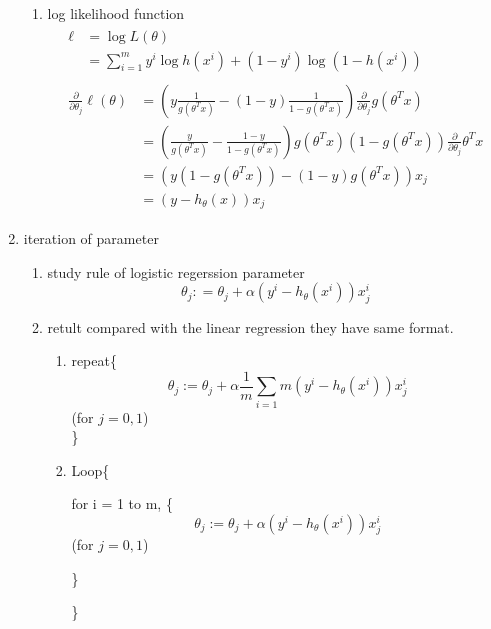 \documentclass[12pt]{ctexart}%
\begin{document}
\begin{enumerate}
\begin{enumerate}
					\item log likelihood function
					\begin{align}
						\begin{split}
							\ell &= \log{L(\theta)} \\
								 &= \sum_{i=1}^{m}y^i \log{h(x^i)} + (1-y^i)\log{(1 - h(x^i))}
						\end{split}\\
						\begin{split}
							\frac{\partial}{\partial \theta_j}\ell(\theta) 
							&= (y\frac{1}{g(\theta^T x)} - (1-y)\frac{1}{1-g(\theta^T x)}) \frac{\partial}{\partial\theta_j}g(\theta^T x)\\
							&= (\frac{y}{g(\theta^T x)} - \frac{1-y}{1-g(\theta^T x)}) g(\theta^T x)(1 - g(\theta^T x))\frac{\partial}{\partial\theta_j}\theta^T x\\
							&= (y(1-g(\theta^T x)) - (1-y)g(\theta^T x))x_j\\
							&= (y - h_\theta(x))x_j
						\end{split}
					\end{align}
				\end{enumerate}
			
			\item iteration of parameter
				\begin{enumerate}
					\item study rule of logistic regerssion parameter
						\begin{equation}
							\theta_j : = \theta_j + \alpha(y^i - h_\theta(x^i))x_j^i
						\end{equation}
						
					\item retult compared with the linear regression
						they have same format.
						\begin{enumerate}
							\item repeat\{
							$$\theta_j := \theta_j + \alpha\frac{1}{m}\sum_{i=1}{m}(y^i - h_\theta(x^i))x_j^i$$
							\qquad \qquad \qquad(for $j = 0,1$)\\
							\}
							
							\item 	Loop\{
							
							\qquad for i = 1 to m, \{
							$$\theta_j := \theta_j + \alpha(y^i - h_\theta(x^i))x_j^i$$
							\qquad \qquad \qquad(for $j = 0,1$)
							
							\qquad \}
							
							\}
						\end{enumerate}
				\end{enumerate}
		\end{enumerate}
	
\end{document}

